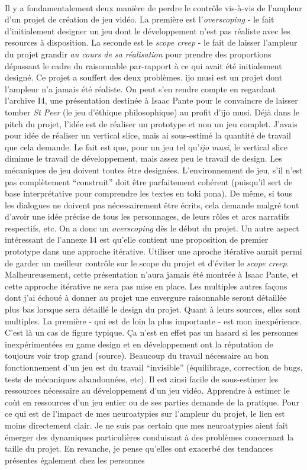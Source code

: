 \documentclass{scrartcl}
\let\emph\relax %
\begin{document}
	
	\emph{Ampleur du projet}\\
	Il y a fondamentalement deux manière de perdre le contrôle vis-à-vis de l'ampleur d'un projet de création de jeu vidéo. La première est l'\textit{overscoping} - le fait d'initialement designer un jeu dont le développement n'est pas réaliste avec les resources à disposition. La seconde est le \textit{scope creep} - le fait de laisser l'ampleur du projet grandir \textit{au cours de sa réalisation} pour prendre des proportions dépassant le cadre du raisonnable par-rapport à ce qui avait été initialement designé. Ce projet a souffert des deux problèmes. ijo musi est un projet dont l'ampleur n'a jamais été réaliste. On peut s'en rendre compte en regardant l'archive I4, une présentation destinée à Isaac Pante pour le convaincre de laisser tomber \textit{St Peer} (le jeu d'éthique philosophique) au profit d'ijo musi. Déjà dans le pitch du projet, l'idée est de réaliser un prototype et non un jeu complet. J’avais pour idée de réaliser un vertical slice, mais ai sous-estimé la quantité de travail que cela demande. Le fait est que, pour un jeu tel qu'\textit{ijo musi}, le vertical slice diminue le travail de développement, mais assez peu le travail de design. Les mécaniques de jeu doivent toutes être designées. L'environnement de jeu, s'il n'est pas complètement “construit” doit être parfaitement cohérent (puisqu'il sert de base interprétative pour comprendre les textes en toki pona). De même, si tous les dialogues ne doivent pas nécessairement être écrits, cela demande malgré tout d'avoir une idée précise de tous les personnages, de leurs rôles et arcs narratifs respectifs, etc. On a donc un \textit{overscoping} dès le début du projet. Un autre aspect intéressant de l'annexe I4 est qu'elle contient une proposition de premier prototype dans une approche itérative. Utiliser une aproche itérative aurait permi de garder un meilleur contrôle sur le scope du projet et d'éviter le \textit{scope creep}. Malheureusement, cette présentation n'aura jamais été montrée à Isaac Pante, et cette approche itérative ne sera pas mise en place. Les multiples autres façons dont j'ai échoué à donner au projet une envergure raisonnable seront détaillée plus bas lorsque sera détaillé le design du projet. Quant à leurs sources, elles sont multiples. La première - qui est de loin la plus importante - est mon inexpérience. C'est là un cas de figure typique. Ça n'est en effet pas un hasard si les personnes inexpérimentées en game design et en développement ont la réputation de toujours voir trop grand (source). Beaucoup du travail nécessaire au bon fonctionnement d'un jeu est du travail “invisible” (équilibrage, correction de bugs, tests de mécaniques abandonnées, etc). Il est ainsi facile de sous-estimer les ressources nécessaire au développement d'un jeu vidéo. Apprendre à estimer le coùt en ressources d'un jeu entier ou de ses parties demande de la pratique. Pour ce qui est de l'impact de mes neuroatypies sur l'ampleur du projet, le lien est moins directement clair. Je ne suis pas certain que mes neuroatypies aient fait émerger des dynamiques particulières conduisant à des problèmes concernant la taille du projet. En revanche, je pense qu'elles ont exacerbé des tendances présentes également chez les personnes 
\end{document}
